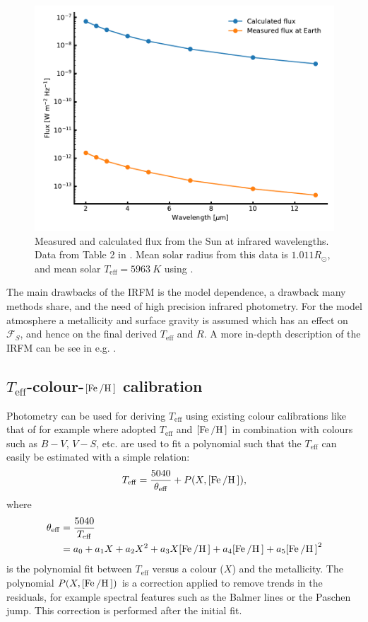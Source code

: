 \begin{figure}[htpb!]
    \centering
    \includegraphics[width=0.85\linewidth]{figures/IRFM.pdf}
    \caption{Measured and calculated flux from the Sun at infrared wavelengths. Data from Table 2 in
             \citet{Blackwell1977}. Mean solar radius from this data is $1.011R_\odot$, and mean
             solar $T_\mathrm{eff}=\SI{5963}{K}$ using .}
    \label{fig:IRFM}
\end{figure}

The main drawbacks of the IRFM is the model dependence, a drawback many methods share, and the need
of high precision infrared photometry. For the model atmosphere a metallicity and surface gravity is
assumed which has an effect on $\mathcal{F}_S$, and hence on the final derived $T_\mathrm{eff}$ and
$R$. A more in-depth description of the IRFM can be see in e.g. \citet[][section 4]{Casagrande2006}.


\subsection{\texorpdfstring{$T_\mathrm{eff}$}{Teff}-colour-\texorpdfstring{$[\ion{Fe}/\ion{H}]$}{[Fe/H]} calibration}

Photometry can be used for deriving $T_\mathrm{eff}$ using existing colour calibrations like that of
for example \citet{Ramirez2005a} where adopted $T_\mathrm{eff}$ and $[\ion{Fe}/\ion{H}]$ in
combination with colours such as $B-V$, $V-S$, etc. are used to fit a polynomial such that the
$T_\mathrm{eff}$ can easily be estimated with a simple relation:
\begin{align}
  T_\mathrm{eff} = \frac{5040}{\theta_\mathrm{eff}} + P(X, [\ion{Fe}/\ion{H}]),
\end{align}
where
\begin{align}
  \theta_\mathrm{eff} &= \frac{5040}{T_\mathrm{eff}} \\
                      &= a_0+a_1 X+a_2 X^2+a_3X[\ion{Fe}/\ion{H}] + a_4[\ion{Fe}/\ion{H}] + a_5[\ion{Fe}/\ion{H}]^2
\end{align}
is the polynomial fit between $T_\mathrm{eff}$ versus a colour ($X$) and the metallicity. The
polynomial $P(X, [\ion{Fe}/\ion{H}])$ is a correction applied to remove trends in the residuals, for
example spectral features such as the Balmer lines or the Paschen jump. This correction is performed
after the initial fit.

